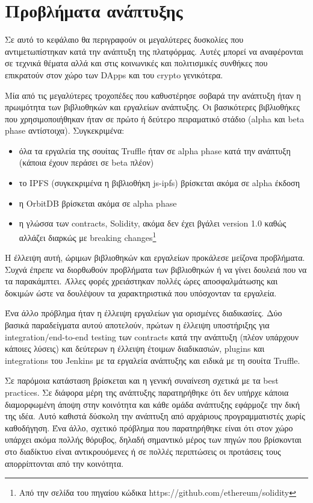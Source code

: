 \section{Προβλήματα ανάπτυξης} \label{section:4-4-problems-faced}

Σε αυτό το κεφάλαιο θα περιγραφούν οι μεγαλύτερες δυσκολίες που αντιμετωπίστηκαν κατά την ανάπτυξη της πλατφόρμας. Αυτές μπορεί να αναφέρονται σε τεχνικά θέματα αλλά και στις κοινωνικές και πολιτισμικές συνθήκες που επικρατούν στον χώρο των DApps και του crypto γενικότερα.

Μία από τις μεγαλύτερες τροχοπέδες που καθυστέρησε σοβαρά την ανάπτυξη ήταν η πρωιμότητα των βιβλιοθηκών και εργαλείων ανάπτυξης. Οι βασικότερες βιβλιοθήκες που χρησιμοποιήθηκαν ήταν σε πρώτο ή δεύτερο πειραματικό στάδιο (alpha και beta phase αντίστοιχα). Συγκεκριμένα:

\begin{itemize}
	\item όλα τα εργαλεία της σουίτας Truffle ήταν σε alpha phase κατά την ανάπτυξη (κάποια έχουν περάσει σε beta πλέον)
	\item το IPFS (συγκεκριμένα η βιβλιοθήκη js-ipfs) βρίσκεται ακόμα σε alpha έκδοση
	\item η OrbitDB βρίσκεται ακόμα σε alpha phase
	\item η γλώσσα των contracts, Solidity, ακόμα δεν έχει βγάλει version 1.0 καθώς αλλάζει διαρκώς με breaking changes\footnote{Από την σελίδα του πηγαίου κώδικα https://github.com/ethereum/solidity}
\end{itemize}

Η έλλειψη αυτή, ώριμων βιβλιοθηκών και εργαλείων προκάλεσε μείζονα προβλήματα. Συχνά έπρεπε να διορθωθούν προβλήματα των βιβλιοθηκών ή να γίνει δουλειά που να τα παρακάμπτει. Άλλες φορές χρειάστηκαν πολλές ώρες αποσφαλμάτωσης και δοκιμών ώστε να δουλέψουν τα χαρακτηριστικά που υπόσχονταν τα εργαλεία.

Ένα άλλο πρόβλημα ήταν η έλλειψη εργαλείων για ορισμένες διαδικασίες. Δύο βασικά παραδείγματα αυτού αποτελούν, πρώτων η έλλειψη υποστήριξης για integration/end-to-end testing των contracts κατά την ανάπτυξη (πλέον υπάρχουν κάποιες λύσεις) και δεύτερων η έλλειψη έτοιμων διαδικασιών, plugins και integrations του Jenkins με τα εργαλεία ανάπτυξης και ειδικά με τη σουίτα Truffle.

Σε παρόμοια κατάσταση βρίσκεται και η γενική συναίνεση σχετικά με τα best practices. Σε διάφορα μέρη της ανάπτυξης παρατηρήθηκε ότι δεν υπήρχε κάποια διαμορφωμένη άποψη στην κοινότητα και κάθε ομάδα ανάπτυξης εφάρμοζε την δική της ιδέα. Αυτό καθιστά δύσκολη την ανάπτυξη από αρχάριους προγραμματιστές χωρίς καθοδήγηση. Ένα άλλο, σχετικό πρόβλημα που παρατηρήθηκε είναι ότι στον χώρο υπάρχει ακόμα πολλής θόρυβος, δηλαδή σημαντικό μέρος των πηγών που βρίσκονται στο διαδίκτυο είναι αντικρουόμενες ή σε πολλές περιπτώσεις οι προτάσεις τους απορρίπτονται από την κοινότητα.

